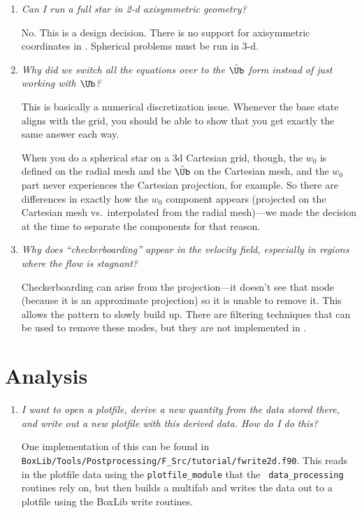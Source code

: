 \begin{enumerate}
\item {\em Can I run a full star in 2-d axisymmetric geometry?}

 No.  This is a design decision.  There is no support for axisymmetric
 coordinates in \maestro.  Spherical problems must be run in 3-d.


\item {\em Why did we switch all the equations over to the
  $\tilde{\Ub}$ form instead of just working with $\Ub$?}

This is basically a numerical discretization issue.  Whenever the base
state aligns with the grid, you should be able to show that you get
exactly the same answer each way.

When you do a spherical star on a 3d Cartesian grid, though, the $w_0$
is defined on the radial mesh and the $\tilde{\Ub}$ on the Cartesian
mesh, and the $w_0$ part never experiences the Cartesian projection,
for example.  So there are differences in exactly how the $w_0$ component
appears (projected on the Cartesian mesh vs.\ interpolated from the
radial mesh)---we made the decision at the time to separate the
components for that reason.


\item {\em Why does ``checkerboarding'' appear in the velocity field,
especially in regions where the flow is stagnant?}

Checkerboarding can arise from the projection---it doesn't see that
mode (because it is an approximate projection) so it is unable to
remove it.  This allows the pattern to slowly build up.  There are
filtering techniques that can be used to remove these modes, but
they are not implemented in \maestro.

\end{enumerate}


\section{Analysis}

\begin{enumerate}

\item {\em I want to open a plotfile, derive a new quantity from
 the data stored there, and write out a new plotfile with this derived 
 data.  How do I do this?}

 One implementation of this can be found in {\tt
   BoxLib/Tools/Postprocessing/F\_Src/tutorial/fwrite2d.f90}.  This reads in
 the plotfile data using the {\tt plotfile\_module} that the {\tt
   data\_processing} routines rely on, but then builds a multifab
   and writes the data out to a plotfile using the BoxLib write
   routines.

\end{enumerate}
